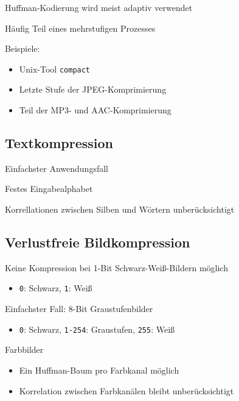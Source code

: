 \documentclass[xcolor=dvipsnames,presentation]{beamer}    %
\newenvironment{witemize}{\itemize\setlength{\itemsep}{1em}}{\enditemize}
\begin{document}
\begin{frame}[<+->]{\insertsection}
  \begin{witemize}
  \item Huffman-Kodierung wird meist adaptiv verwendet
  \item Häufig Teil eines mehrstufigen Prozesses
  \item Beispiele:
    \begin{itemize}
    \item Unix-Tool {\tt{compact}}
    \item Letzte Stufe der JPEG-Komprimierung
    \item Teil der MP3- und AAC-Komprimierung
    \end{itemize}
  \end{witemize}
\end{frame}

\subsection{Textkompression}

\begin{frame}[<+->]{\insertsubsection}
  \begin{witemize}
  \item Einfachster Anwendungsfall
  \item Festes Eingabealphabet
  \item Korrellationen zwischen Silben und Wörtern unberücksichtigt
  \end{witemize}
\end{frame}

\subsection{Verlustfreie Bildkompression}

\begin{frame}[<+->]{\insertsubsection}
\begin{witemize}
\item Keine Kompression bei 1-Bit Schwarz-Weiß-Bildern möglich
  \begin{itemize}
    \item {\tt0}: Schwarz, {\tt1}: Weiß
  \end{itemize}

\item Einfachster Fall: 8-Bit Graustufenbilder
  \begin{itemize}
    \item {\tt0}: Schwarz, {\tt1-254}: Graustufen, {\tt255}: Weiß
  \end{itemize}

\item Farbbilder
  \begin{itemize}
    \item Ein Huffman-Baum pro Farbkanal möglich
    \item Korrelation zwischen Farbkanälen bleibt unberücksichtigt
  \end{itemize}
\end{witemize}
\end{frame}
\end{document}

